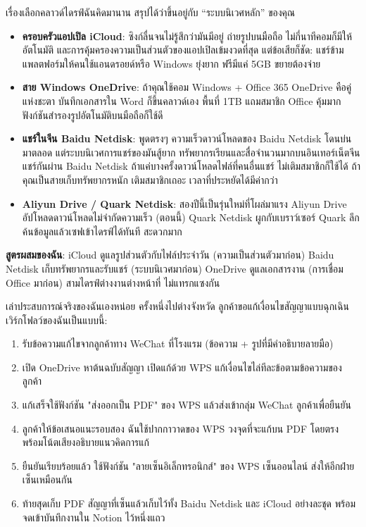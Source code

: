 
เรื่องเลือกคลาวด์ไดรฟ์ฉันคิดมานาน สรุปได้ว่าขึ้นอยู่กับ “ระบบนิเวศหลัก” ของคุณ

\begin{itemize}
  \item \textbf{ครอบครัวแอปเปิล iCloud}: ซิงก์ลื่นจนไม่รู้สึกว่ามันมีอยู่ ถ่ายรูปบนมือถือ ไม่กี่นาทีคอมก็มีให้อัตโนมัติ และการคุ้มครองความเป็นส่วนตัวของแอปเปิลเข้มงวดที่สุด แต่ข้อเสียก็ชัด: แชร์ข้ามแพลตฟอร์มให้คนใช้แอนดรอยด์หรือ Windows ยุ่งยาก ฟรีมีแค่ 5GB ขยายต้องจ่าย
  \item \textbf{สาย Windows OneDrive}: ถ้าคุณใช้คอม Windows + Office 365 OneDrive คือคู่แห่งชะตา บันทึกเอกสารใน Word ก็ขึ้นคลาวด์เอง พื้นที่ 1TB แถมสมาชิก Office คุ้มมาก ฟังก์ชันสำรองรูปอัตโนมัติบนมือถือก็ใช้ดี
  \item \textbf{แชร์ในจีน Baidu Netdisk}: พูดตรงๆ ความเร็วดาวน์โหลดของ Baidu Netdisk โดนบ่นมาตลอด แต่ระบบนิเวศการแชร์ของมันสู้ยาก ทรัพยากรเรียนและสื่อจำนวนมากบนอินเทอร์เน็ตจีนแชร์กันผ่าน Baidu Netdisk ถ้าแค่บางครั้งดาวน์โหลดไฟล์ที่คนอื่นแชร์ ไม่เติมสมาชิกก็ใช้ได้ ถ้าคุณเป็นสายเก็บทรัพยากรหนัก เติมสมาชิกเถอะ เวลาที่ประหยัดได้มีค่ากว่า
  \item \textbf{Aliyun Drive / Quark Netdisk}: สองปีนี้เป็นรุ่นใหม่ที่โผล่มาแรง Aliyun Drive อัปโหลดดาวน์โหลดไม่จำกัดความเร็ว (ตอนนี้) Quark Netdisk ผูกกับเบราว์เซอร์ Quark ลึก ค้นข้อมูลแล้วเซฟเข้าไดรฟ์ได้ทันที สะดวกมาก
\end{itemize}

\textbf{สูตรผสมของฉัน}: iCloud ดูแลรูปส่วนตัวกับไฟล์ประจำวัน (ความเป็นส่วนตัวมาก่อน) Baidu Netdisk เก็บทรัพยากรและรับแชร์ (ระบบนิเวศมาก่อน) OneDrive ดูแลเอกสารงาน (การเชื่อม Office มาก่อน) สามไดรฟ์ต่างงานต่างหน้าที่ ไม่แทรกแซงกัน


เล่าประสบการณ์จริงของฉันเองหน่อย ครั้งหนึ่งไปต่างจังหวัด ลูกค้าขอแก้เงื่อนไขสัญญาแบบฉุกเฉิน เวิร์กโฟลว์ของฉันเป็นแบบนี้:

\begin{enumerate}
  \item รับข้อความแก้ไขจากลูกค้าทาง WeChat ที่โรงแรม (ข้อความ + รูปที่มีคำอธิบายลายมือ)
  \item เปิด OneDrive หาต้นฉบับสัญญา เปิดแก้ด้วย WPS แก้เงื่อนไขไล่ทีละข้อตามข้อความของลูกค้า
  \item แก้เสร็จใช้ฟังก์ชัน "ส่งออกเป็น PDF" ของ WPS แล้วส่งเข้ากลุ่ม WeChat ลูกค้าเพื่อยืนยัน
  \item ลูกค้าให้ข้อเสนอแนะรอบสอง ฉันใช้ปากกาวาดของ WPS วงจุดที่จะแก้บน PDF โดยตรง พร้อมโน้ตเสียงอธิบายแนวคิดการแก้
  \item ยืนยันเรียบร้อยแล้ว ใช้ฟังก์ชัน "ลายเซ็นอิเล็กทรอนิกส์" ของ WPS เซ็นออนไลน์ ส่งให้อีกฝ่ายเซ็นเหมือนกัน
  \item ท้ายสุดเก็บ PDF สัญญาที่เซ็นแล้วเก็บไว้ทั้ง Baidu Netdisk และ iCloud อย่างละชุด พร้อมจดเข้าบันทึกงานใน Notion ไว้หนึ่งแถว
\end{enumerate}

